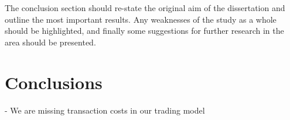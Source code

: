 The conclusion section should re-state the original aim of the dissertation and outline the most important results. Any weaknesses of the study as a whole should be highlighted, and finally some suggestions for further research in the area should be presented.


\chapter{Conclusions}

- We are missing transaction costs in our trading model